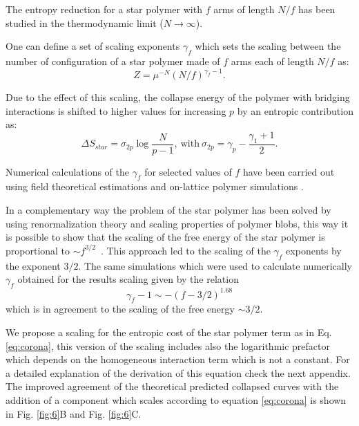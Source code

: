 \documentclass[
preprint,
a4paper,
12pt,
superscriptaddress,
pre]{revtex4}
\begin{document}
The entropy reduction for a star polymer with
$f$ arms of length $N/f$ has been studied in the thermodynamic
limit ($N \to \infty$)\cite{Schafer1992}.

One can define a set of scaling exponents $\gamma_f$ which sets the
scaling between the number of configuration of a star polymer made of
$f$ arms each of length $N/f$ as:
\begin{equation}
Z = \mu^{-N} \left(N/f\right)^{\gamma_f - 1}.
\end{equation}

Due to the effect of this scaling, the collapse energy of the polymer
with bridging interactions is shifted to higher values for increasing
$p$ by an entropic contribution as\cite{Hanke2003}:
\begin{equation}
\Delta S_{star} = \sigma_{2p} \log \frac{N}{p-1},\ 
\mathrm{with}\ \sigma_{2p} = \gamma_p - \frac{\gamma_1 + 1}{2}.
\label{eq:sstar}
\end{equation}

Numerical calculations of the $\gamma_f$ for selected values of $f$
have been carried out using field theoretical
estimations\cite{Schafer1992} and on-lattice polymer simulations 
\cite{Batoulis1989,Grest1994,Caracciolo1998,Zifferer1999,Shida2000,
Hsu2004}.

In a complementary way the problem of the star
polymer has been solved by using renormalization theory and scaling
properties of polymer blobs\cite{Daoud1982}, this way it is possible
to show that the scaling of the free energy of the star polymer is
proportional to $\sim f^{3/2}$~\cite{Witten1986}. This approach led to
the scaling of the $\gamma_f$ exponents by the
exponent $3/2$. The same simulations which were used to calculate
numerically $\gamma_f$ obtained\cite{Hsu2004} for the results scaling
given by the relation 
\begin{equation}
\gamma_f - 1 \sim -(f-3/2)^{1.68}
\label{eq:grass}
\end{equation}
which is in agreement to the scaling of the free energy $\sim 3/2$.

We propose a scaling for the entropic cost of the star
polymer term as in Eq. \ref{eq:corona}, this version of the scaling
includes also the logarithmic prefactor which depends on the
homogeneous interaction term which is not a constant. For a detailed
explanation of the derivation of this equation check the next
appendix.
%
The improved agreement of the theoretical predicted collapsed curves
with the addition of a component which scales according to equation
\ref{eq:corona} is shown in Fig. \ref{fig:6}B and Fig. \ref{fig:6}C.
\end{document}

